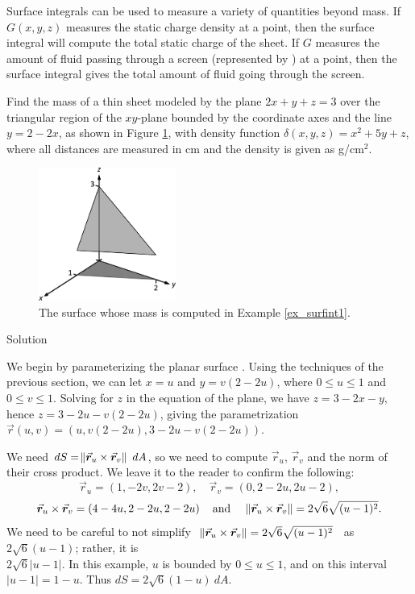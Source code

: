 Surface integrals can be used to measure a variety of quantities beyond mass. If $G(x,y,z)$ measures the static charge density at a point, then the surface integral will compute the total static charge of the sheet. If $G$ measures the amount of fluid passing through a screen (represented by \surfaceS) at a point, then the surface integral gives the total amount of fluid going through the screen.


\begin{example}
\label{ex_surfint1}
Find the mass of a thin sheet modeled by the plane $2x+y+z=3$ over the triangular region of the $xy$-plane bounded by the coordinate axes and the line $y=2-2x$, as shown in Figure \ref{fig_Vector_Calc_26}, with density function $\delta(x,y,z) = x^2+5y+z$, where all distances are measured in cm and the density is given as g/cm$^2$. 

\begin{figure}[H]
	\begin{center}
			\includegraphics[width=0.4\textwidth]{fig_Vector_Calc_26}
	\caption{The surface whose mass is computed in Example \ref{ex_surfint1}.}
	\label{fig_Vector_Calc_26}
	\end{center}
\end{figure}

Solution 


We begin by parameterizing the planar surface \surfaceS. Using the techniques of the previous section, we can let $x=u$ and $y=v(2-2u)$, where $0\leq u\leq 1$ and $0\leq v\leq 1$. Solving for $z$ in the equation of the plane, we have $z=3-2x-y$, hence $z = 3-2u-v(2-2u)$, giving the parametrization
$\vec r(u,v) = \left( u, v(2-2u), 3-2u-v(2-2u)\right)$.


We need $dS=\norm{\vec r_u \times \vec r_v}\ dA$, so we need to compute $\vec r_u$, $\vec r_v$ and the norm of their cross product. We leave it to the reader to confirm the following:
$$\vec r_u = \left( 1,-2v,2v-2\right),\quad \vec r_v = \left( 0,2-2u, 2u-2\right),$$
$$\vec r_u\times \vec r_v = \left( 4-4u,2-2u,2-2u\right)\quad \text{and }\quad \norm{\vec r_u\times \vec r_v} = 2\sqrt{6}\sqrt{(u-1)^2}.$$
We need to be careful to not simplify \ $\norm{\vec r_u\times \vec r_v} = 2\sqrt{6}\sqrt{(u-1)^2}$ \  as \  $2\sqrt{6}(u-1)$; rather, it is \\ $2\sqrt{6}|u-1|$. In this example, $u$ is bounded by $0\leq u\leq 1$, and on this interval $|u-1| = 1-u$. Thus $dS = 2\sqrt{6}(1-u)\ dA$. 


\end{example}

